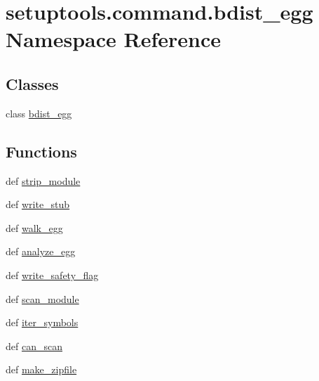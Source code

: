 \hypertarget{namespacesetuptools_1_1command_1_1bdist__egg}{}\section{setuptools.\+command.\+bdist\+\_\+egg Namespace Reference}
\label{namespacesetuptools_1_1command_1_1bdist__egg}
\subsection*{Classes}
\begin{DoxyCompactItemize}
\item 
class \hyperlink{classsetuptools_1_1command_1_1bdist__egg_1_1bdist__egg}{bdist\+\_\+egg}
\end{DoxyCompactItemize}
\subsection*{Functions}
\begin{DoxyCompactItemize}
\item 
def \hyperlink{namespacesetuptools_1_1command_1_1bdist__egg_ab05465dda84d9f983dfb5fd0e46a115e}{strip\+\_\+module}
\item 
def \hyperlink{namespacesetuptools_1_1command_1_1bdist__egg_a3b3e49e3874d7a1f90df5d25461d3636}{write\+\_\+stub}
\item 
def \hyperlink{namespacesetuptools_1_1command_1_1bdist__egg_af422a85b6ac542ee2bebb1cb6a79a9c0}{walk\+\_\+egg}
\item 
def \hyperlink{namespacesetuptools_1_1command_1_1bdist__egg_a6fb2c2865753edcfc6167410bf5d20dc}{analyze\+\_\+egg}
\item 
def \hyperlink{namespacesetuptools_1_1command_1_1bdist__egg_a265900e7d91215967b0af3078914ca56}{write\+\_\+safety\+\_\+flag}
\item 
def \hyperlink{namespacesetuptools_1_1command_1_1bdist__egg_aaa8969ecb959642491c129903c9ed7a3}{scan\+\_\+module}
\item 
def \hyperlink{namespacesetuptools_1_1command_1_1bdist__egg_afdbee233796e257be69874db7006af41}{iter\+\_\+symbols}
\item 
def \hyperlink{namespacesetuptools_1_1command_1_1bdist__egg_a2833d65110bf8ae138eab4b396e729fe}{can\+\_\+scan}
\item 
def \hyperlink{namespacesetuptools_1_1command_1_1bdist__egg_a2a74021c9255f5d51ca14656aba387dc}{make\+\_\+zipfile}
\end{DoxyCompactItemize}
